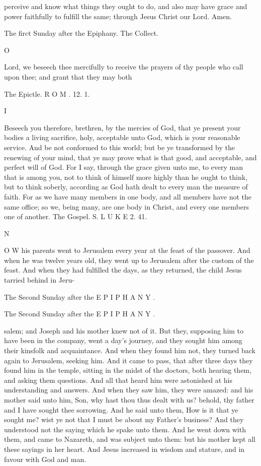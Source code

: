 perceive and know what things they ought to do, and also may have grace and power faithfully to fulfill the same; through Jesus Christ our Lord. Amen.

The firct Sunday after the Epiphany. The Collect.

O

Lord, we beseech thee mercifully to receive the prayers of thy people who call upon thee; and grant that they may both

The Epictle. R O M . 12. 1.

I

Beseech you therefore, brethren, by the mercies of God, that ye present your bodies a living sacrifice, holy, acceptable unto God, which is your reasonable service. And be not conformed to this world; but be ye transformed by the renewing of your mind, that ye may prove what is that good, and acceptable, and perfect will of God. For I say, through the grace given unto me, to every man that is among you, not to think of himself more highly than he ought to think, but to think soberly, according as God hath dealt to every man the measure of faith. For as we have many members in one body, and all members have not the same office; so we, being many, are one body in Christ, and every one members one of another. The Gospel. S. L U K E 2. 41.

N

O W his parents went to Jerusalem every year at the feast of the passover. And when he was twelve years old, they went up to Jerusalem after the custom of the feast. And when they had fulfilled the days, as they returned, the child Jesus tarried behind in Jeru-

The Second Sunday after the E P I P H A N Y .

The Second Sunday after the E P I P H A N Y .

salem; and Joseph and his mother knew not of it. But they, supposing him to have been in the company, went a day's journey, and they sought him among their kinsfolk and acquaintance. And when they found him not, they turned back again to Jerusalem, seeking him. And it came to pass, that after three days they found him in the temple, sitting in the midst of the doctors, both hearing them, and asking them questions. And all that heard him were astonished at his understanding and answers. And when they saw him, they were amazed: and his mother said unto him, Son, why hast thou thus dealt with us? behold, thy father and I have sought thee sorrowing. And he said unto them, How is it that ye sought me? wist ye not that I must be about my Father's business? And they understood not the saying which he spake unto them. And he went down with them, and came to Nazareth, and was subject unto them: but his mother kept all these sayings in her heart. And Jesus increased in wisdom and stature, and in favour with God and man.

